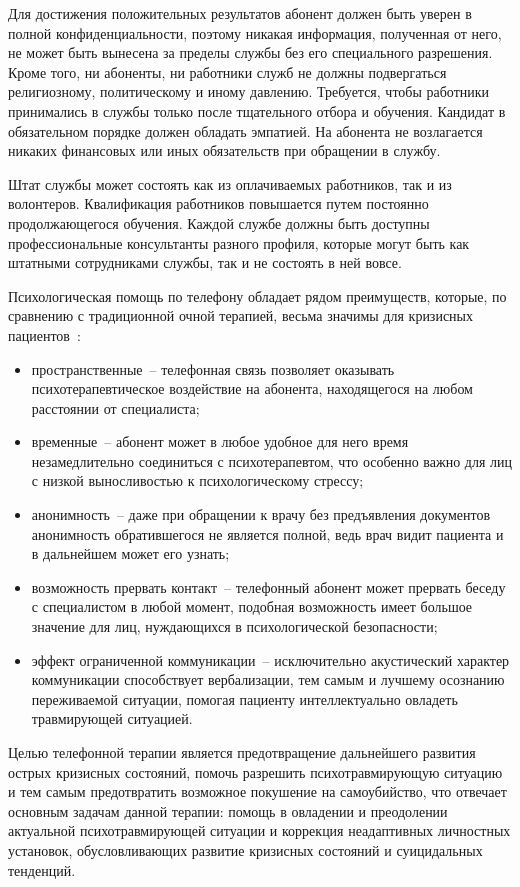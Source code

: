 Для достижения положительных результатов абонент должен быть уверен в полной конфиденциальности, поэтому никакая информация, полученная от него, не может быть вынесена за пределы службы без его специального разрешения. Кроме того, ни абоненты, ни работники служб не должны подвергаться религиозному, политическому и иному давлению. Требуется, чтобы работники принимались в службы только после тщательного отбора и обучения. Кандидат в обязательном порядке должен обладать эмпатией. На абонента не возлагается никаких финансовых или иных обязательств при обращении в службу.~\cite{starsen}

Штат службы может состоять как из оплачиваемых работников, так и из волонтеров. Квалификация работников повышается путем постоянно продолжающегося обучения. Каждой службе должны быть доступны профессиональные консультанты разного профиля, которые могут быть как штатными сотрудниками службы, так и не состоять в ней вовсе.~\cite{starsen}

Психологическая помощь по телефону обладает рядом преимуществ, которые, по сравнению с традиционной очной терапией, весьма значимы для кризисных пациентов~\cite{starsen}:

\begin{itemize}
	\item пространственные~-- телефонная связь позволяет оказывать психотерапевтическое воздействие на абонента, находящегося на любом расстоянии от специалиста;
	\item временные~-- абонент может в любое удобное для него время незамедлительно соединиться с психотерапевтом, что особенно важно для лиц с низкой выносливостью к психологическому стрессу;
	\item анонимность~-- даже при обращении к врачу без предъявления документов анонимность обратившегося не является полной, ведь врач видит пациента и в дальнейшем может его узнать;
	\item возможность прервать контакт~-- телефонный абонент может прервать беседу с специалистом в любой момент, подобная возможность имеет большое значение для лиц, нуждающихся в психологической безопасности;
	\item эффект ограниченной коммуникации~-- исключительно акустический характер коммуникации способствует вербализации, тем самым и лучшему осознанию переживаемой ситуации, помогая пациенту интеллектуально овладеть травмирующей ситуацией.
\end{itemize}

Целью телефонной терапии является предотвращение дальнейшего развития острых кризисных состояний, помочь разрешить психотравмирующую ситуацию и тем самым предотвратить возможное покушение на самоубийство, что отвечает основным задачам данной терапии: помощь в овладении и преодолении актуальной психотравмирующей ситуации и коррекция неадаптивных личностных установок, обусловливающих развитие кризисных состояний и суицидальных тенденций.


